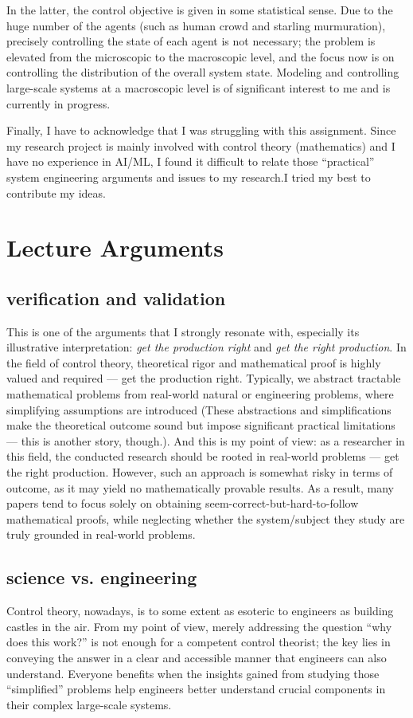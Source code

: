 \documentclass[11pt]{article}
\begin{document}
In the latter, the control objective is given in some statistical sense.
Due to the huge number of the agents (such as human crowd and starling murmuration), precisely controlling the state of each agent is not necessary; the problem is elevated from the microscopic to the macroscopic level, and the focus now is on controlling the distribution of the overall system state. Modeling and controlling large-scale systems at a macroscopic level is of significant interest to me and is currently in progress.

Finally, I have to acknowledge that I was struggling with this assignment. Since my research project is mainly involved with control theory (mathematics) and I have no experience in AI/ML, I found it difficult to relate those ``practical'' system engineering arguments and issues to my research.I tried my best to contribute my ideas.

\section{Lecture Arguments}
\subsection{verification and validation}
This is one of the arguments that I strongly resonate with, especially its illustrative interpretation: \emph{get the production right} and \emph{get the right production}. In the field of control theory, theoretical rigor and mathematical proof is highly valued and required — get the production right. Typically, we abstract tractable mathematical problems from real-world natural or engineering problems, where simplifying assumptions are introduced (These abstractions and simplifications make the theoretical outcome sound but impose significant practical limitations — this is another story, though.). And this is my point of view: as a researcher in this field, the conducted research should be rooted in real-world problems — get the right production. However, such an approach is somewhat risky in terms of outcome, as it may yield no mathematically provable results. As a result, many papers tend to focus solely on obtaining seem-correct-but-hard-to-follow mathematical proofs, while neglecting whether the system/subject they study are truly grounded in real-world problems. 

\subsection{science vs. engineering}
Control theory, nowadays, is to some extent as esoteric to engineers as building castles in the air. From my point of view, merely addressing the question “why does this work?” is not enough for a competent control theorist; the key lies in conveying the answer in a clear and accessible manner that engineers can also understand. Everyone benefits when the insights gained from studying those “simplified” problems help engineers better understand crucial components in their complex large-scale systems. 
\end{document}

